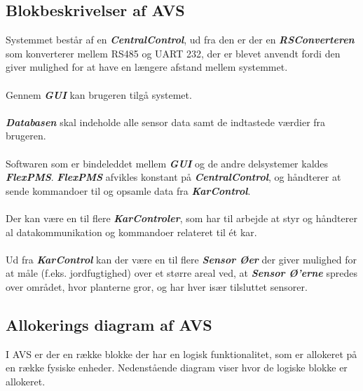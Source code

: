 \subsection{Blokbeskrivelser af AVS}
Systemmet består af en \textbf{\textit{CentralControl}}, ud fra den er der en \textbf{\textit{RSConverteren}} som konverterer mellem RS485 og UART 232, der er blevet anvendt fordi den giver mulighed for at have en længere afstand mellem systemmet.
\\\\
Gennem \textbf{\textit{GUI}} kan brugeren tilgå systemet.
\\\\
\textbf{\textit{Databasen}} skal indeholde alle sensor data samt de indtastede værdier fra brugeren. 
\\\\
Softwaren som er bindeleddet mellem \textbf{\textit{GUI}} og de andre delsystemer kaldes \textbf{\textit{FlexPMS}}. \textbf{\textit{FlexPMS}} afvikles konstant på \textbf{\textit{CentralControl}}, og håndterer at sende kommandoer til og opsamle data fra \textbf{\textit{KarControl}}.
\\\\
Der kan være en til flere \textbf{\textit{KarControler}}, som har til arbejde at styr og håndterer al datakommunikation og kommandoer relateret til ét kar.
\\\\
Ud fra \textbf{\textit{KarControl}} kan der være en til flere \textbf{\textit{Sensor Øer}} der giver mulighed for at måle (f.eks. jordfugtighed) over et større areal ved, at \textbf{\textit{Sensor
Ø’erne}} spredes over området, hvor planterne gror, og har hver især tilsluttet sensorer.

\subsection{Allokerings diagram af AVS}
I AVS er der en række blokke der har en logisk funktionalitet, som er allokeret på en række fysiske enheder. Nedenstående diagram viser hvor de logiske blokke er allokeret.

